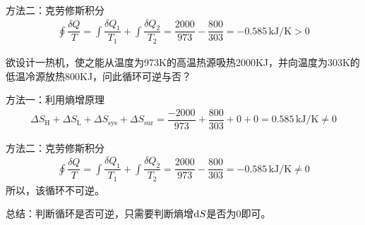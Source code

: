 \solveother 
方法二：克劳修斯积分
\begin{align*}
	\oint \dfrac{\delta Q}{T} = \int \dfrac{\delta Q_1}{T_1} + \int \dfrac{\delta Q_2}{T_2} = \dfrac{2000}{973} - \dfrac{800}{303} = -0.585\,\text{kJ/K} > 0
\end{align*}

\example[判断过程是否可逆]
欲设计一热机，使之能从温度为973K的高温热源吸热2000KJ，并向温度为303K的低温冷源放热800KJ，问此循环可逆与否？

\solve
方法一：利用熵增原理
\begin{align*}
	\Delta S_{\text{H}} + \Delta S_{\text{L}} + \Delta S_{\text{sys}} + \Delta S_{\text{sur}} = \dfrac{-2000}{973} + \dfrac{800}{303} + 0 + 0 = 0.585\,\text{kJ/K} \neq 0
\end{align*}

\solveother 
方法二：克劳修斯积分
\begin{align*}
	\oint \dfrac{\delta Q}{T} = \int \dfrac{\delta Q_1}{T_1} + \int \dfrac{\delta Q_2}{T_2} = \dfrac{2000}{973} - \dfrac{800}{303} = -0.585\,\text{kJ/K} \neq 0
\end{align*}
所以，该循环不可逆。

总结：判断循环是否可逆，只需要判断熵增${\rm{d}} S$是否为0即可。
\vspace*{1.5em}

